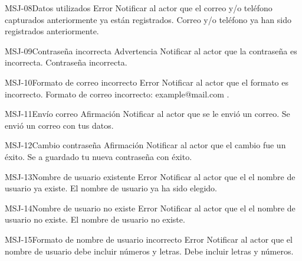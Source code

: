 	\begin{Message}{MSJ-08}{Datos utilizados}
		\MSGitem[Tipo:] Error
		\MSGitem[Objetivo: ] Notificar al actor que el correo y/o teléfono capturados anteriormente ya están registrados.
		\MSGitem[Redacción: ] Correo y/o teléfono ya han sido registrados anteriormente.
	\end{Message}

	\begin{Message}{MSJ-09}{Contraseña incorrecta}
		\MSGitem[Tipo:] Advertencia
		\MSGitem[Objetivo: ] Notificar al actor que la contraseña es incorrecta.
		\MSGitem[Redacción: ] Contraseña incorrecta.
	\end{Message}

	\begin{Message}{MSJ-10}{Formato de correo incorrecto}
	\MSGitem[Tipo:] Error
	\MSGitem[Objetivo: ] Notificar al actor que el formato es incorrecto.
	\MSGitem[Redacción: ] Formato de correo incorrecto: example@mail.com .
	\end{Message}

	\begin{Message}{MSJ-11}{Envío correo}
	\MSGitem[Tipo:] Afirmación
	\MSGitem[Objetivo: ] Notificar al actor que se le envió un correo.
	\MSGitem[Redacción: ] Se envió un correo con tus datos. 
	\end{Message}
	
	\begin{Message}{MSJ-12}{Cambio contraseña}
	\MSGitem[Tipo:] Afirmación
	\MSGitem[Objetivo: ] Notificar al actor que el cambio fue un éxito.
	\MSGitem[Redacción: ] Se a guardado tu nueva contraseña con éxito. 
	\end{Message}
	
	\begin{Message}{MSJ-13}{Nombre de usuario existente}
	\MSGitem[Tipo:] Error
	\MSGitem[Objetivo: ] Notificar al actor que el el nombre de usuario ya existe.
	\MSGitem[Redacción: ] El nombre de usuario ya ha sido elegido. 
	\end{Message}

	\begin{Message}{MSJ-14}{Nombre de usuario no existe}
	\MSGitem[Tipo:] Error
	\MSGitem[Objetivo: ] Notificar al actor que el el nombre de usuario no existe.
	\MSGitem[Redacción: ] El nombre de usuario no existe. 
	\end{Message}	
	
	\begin{Message}{MSJ-15}{Formato de nombre de usuario incorrecto}
	\MSGitem[Tipo:] Error
	\MSGitem[Objetivo: ] Notificar al actor que el nombre de usuario debe incluir números y letras. 
	\MSGitem[Redacción: ] Debe incluir letras y números. 
	\end{Message}
	
